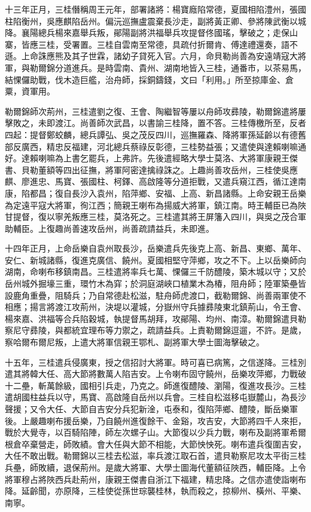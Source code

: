 \begin{pinyinscope}
十三年正月，三桂僭稱周王元年，部署諸將：楊寶廕陷常德，夏國相陷澧州，張國柱陷衡州，吳應麒陷岳州。偏沅巡撫盧震棄長沙走，副將黃正卿、參將陳武衡以城降。襄陽總兵楊來嘉舉兵叛，鄖陽副將洪福舉兵攻提督佟國瑤，擊破之；走保山寨，皆應三桂，受署置。三桂自雲南至常德，具疏付折爾肯、傅達禮還奏，語不遜。上命誅應熊及其子世霖，諸幼子貸死入官。六月，命貝勒尚善為安遠靖寇大將軍，與勒爾錦分道進兵。是時雲南、貴州、湖南地皆入三桂，通番市，以茶易馬，結惈儸助戰，伐木造巨艦，治舟師，採銅鑄錢，文曰「利用。」所至掠庫金、倉粟，資軍用。

勒爾錦師次荊州，三桂遣劉之復、王會、陶繼智等屢以舟師攻彞陵，勒爾錦遣將屢擊敗之，未即渡江。尚善師次武昌，以書諭三桂降，置不答。三桂傳檄所至，反者四起：提督鄭蛟麟，總兵譚弘、吳之茂反四川，巡撫羅森、降將軍孫延齡以有德舊部反廣西，精忠反福建，河北總兵蔡祿反彰德，三桂勢益張；又遣使與達賴喇嘛通好。達賴喇嘛為上書乞罷兵，上弗許。先後遣經略大學士莫洛、大將軍康親王傑書、貝勒董額等四出征撫，將軍阿密達擒祿誅之。上趣尚善攻岳州，三桂使吳應麒、廖進忠、馬寶、張國柱、柯鐸、高啟隆等分道拒戰，又遣兵窺江西，循江達南康，陷都昌；復自長沙入袁州，陷萍鄉、安福、上高、新昌諸縣。上命安親王岳樂為定遠平寇大將軍，徇江西；簡親王喇布為揚威大將軍，鎮江南。時王輔臣已為陜甘提督，復以寧羌叛應三桂，莫洛死之。三桂遣其將王屏籓入四川，與吳之茂合軍助輔臣。上復趣尚善速攻岳州，尚善疏請益兵，未即進。

十四年正月，上命岳樂自袁州取長沙，岳樂遣兵先後克上高、新昌、東鄉、萬年、安仁、新城諸縣，復進克廣信、饒州。夏國相堅守萍鄉，攻之不下。上以岳樂師向湖南，命喇布移鎮南昌。三桂遣將率兵七萬、惈儸三千防醴陵，築木城以守；又於岳州城外掘壕三重，環竹木為穽；於洞庭湖峽口植業木為椿，阻舟師；陸軍築壘皆設鹿角重疊，阻騎兵；乃自常德赴松滋，駐舟師虎渡口，截勒爾錦、尚善兩軍使不相應；揚言將渡江攻荊州，決堤以灌城，分嶽州守兵據彞陵東北鎮荊山，令王會、楊來嘉、洪福等合兵陷穀城，執提督馬胡拜，攻鄖陽、均州、南漳。勒爾錦遣貝勒察尼守彞陵，與都統宜理布等力禦之，疏請益兵。上責勒爾錦逗遛，不許。是歲，察哈爾布爾尼叛，上遣大將軍信親王鄂札、副將軍大學士圖海擊破之。

十五年，三桂遣兵侵廣東，授之信招討大將軍。時可喜已病篤，之信遂降。三桂別遣其將韓大任、高大節將數萬人陷吉安。上令喇布固守饒州，岳樂攻萍鄉，力戰破十二壘，斬萬餘級，國相引兵走，乃克之。師進復醴陵、瀏陽，復進攻長沙。三桂遣胡國柱益兵以守，馬寶、高啟隆自岳州以兵會。三桂自松滋移屯嶽麓山，為長沙聲援；又令大任、大節自吉安分兵犯新淦，屯泰和，復陷萍鄉、醴陵，斷岳樂軍後。上嚴趣喇布援岳樂，乃自饒州進復餘干、金谿，攻吉安，大節將四千人來拒，戰於大覺寺，以百騎陷陣，師左次螺子山。大節復以少兵力戰，喇布及副將軍希爾根倉卒棄營走，師敗績。會大任與大節不相能，大節怏怏死。喇布遣兵復圍吉安，大任不敢出戰。勒爾錦以三桂去松滋，率兵渡江取石首，遣貝勒察尼攻太平街三桂兵壘，師敗續，退保荊州。是歲大將軍、大學士圖海代董額征陜西，輔臣降。上令將軍穆占將陜西兵赴荊州，康親王傑書自浙江下福建，精忠降。之信亦遣使詣喇布降。延齡聞，亦原降，三桂使從孫世琮襲桂林，執而殺之，掠柳州、橫州、平樂、南寧。


\end{pinyinscope}
